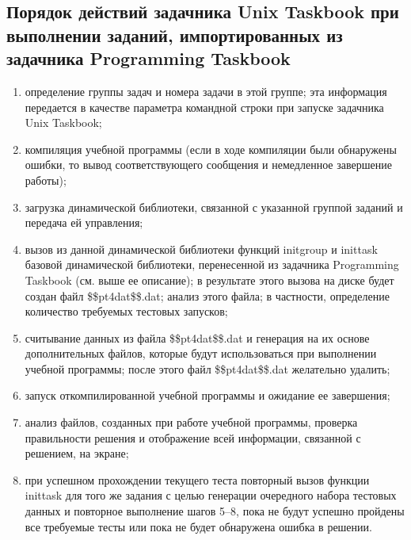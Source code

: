 \subsection{Порядок действий задачника Unix Taskbook при выполнении заданий, импортированных из задачника Programming Taskbook}
\begin{enumerate}
    \item определение группы задач и номера задачи в этой группе; эта информация передается в качестве параметра командной строки при запуске задачника Unix Taskbook;
    \item компиляция учебной программы (если в ходе компиляции были обнаружены ошибки, то вывод соответствующего сообщения и немедленное завершение работы);
    \item загрузка динамической библиотеки, связанной с указанной группой заданий и передача ей управления;
    \item вызов из данной динамической библиотеки функций initgroup и inittask базовой динамической библиотеки, перенесенной из задачника Programming Taskbook (см. выше ее описание); в результате этого вызова на диске будет создан файл \$\$pt4dat\$\$.dat; анализ этого файла; в частности, определение количество требуемых тестовых запусков;
    \item считывание данных из файла \$\$pt4dat\$\$.dat и генерация на их основе дополнительных файлов, которые будут использоваться при выполнении учебной программы; после этого файл \$\$pt4dat\$\$.dat желательно удалить;
    \item запуск откомпилированной учебной программы и ожидание ее завершения;
    \item анализ файлов, созданных при работе учебной программы, проверка правильности решения и отображение всей информации, связанной с решением, на экране;
    \item при успешном прохождении текущего теста повторный вызов функции inittask для того же задания с целью генерации очередного набора тестовых данных и повторное выполнение шагов 5–8, пока не будут успешно пройдены все требуемые тесты или пока не будет обнаружена ошибка в решении.
\end{enumerate}

\newpage